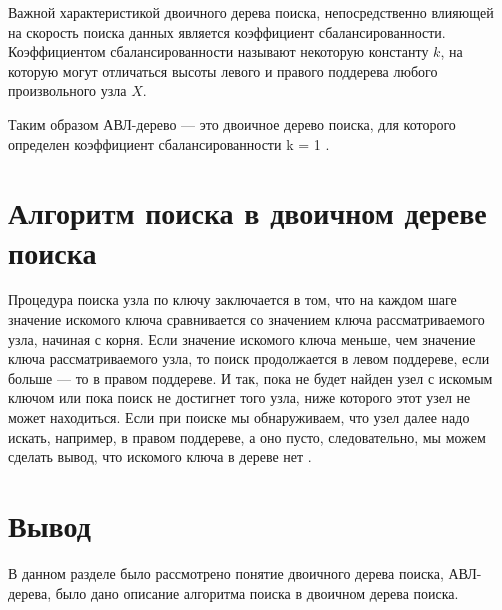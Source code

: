 Важной характеристикой двоичного дерева поиска, непосредственно влияющей на скорость поиска данных является коэффициент сбалансированности. 
Коэффициентом сбалансированности называют некоторую константу $k$, на которую могут отличаться высоты левого и правого поддерева любого произвольного узла $X$.

Таким образом АВЛ-дерево --- это двоичное дерево поиска, для которого определен коэффициент сбалансированности k = 1 \cite{info_awl_tree}.

\section{Алгоритм поиска в двоичном дереве поиска}

Процедура поиска узла по ключу заключается в том, что на каждом шаге значение искомого ключа сравнивается со значением ключа рассматриваемого узла, начиная с корня. 
Если значение искомого ключа меньше, чем значение ключа рассматриваемого узла, то поиск продолжается в левом поддереве, если больше — то в правом поддереве. 
И так, пока не будет найден узел с искомым ключом или пока поиск не достигнет того узла, ниже которого этот узел не может находиться. 
Если при поиске мы обнаруживаем, что узел далее надо искать, например, в правом
поддереве, а оно пусто, следовательно, мы можем сделать вывод, что искомого ключа в дереве нет \cite{info_book_bst}.

\section*{Вывод}

В данном разделе было рассмотрено понятие двоичного дерева поиска, АВЛ-дерева, было дано описание алгоритма поиска в двоичном дерева поиска.
